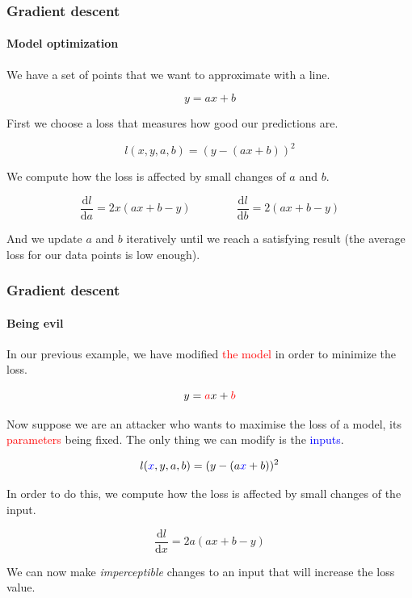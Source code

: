 \documentclass[9pt]{beamer}
\begin{document}
\begin{frame}
  \frametitle{Gradient descent}

  \framesubtitle{Model optimization}

  \begin{center}
    \scalebox{0.5}{
      
    }
  \end{center}

  We have a set of points that we want to approximate with a line.

  \[
  y = ax + b
  \]

  \pause

  First we choose a loss that measures how good our predictions are.

  \[
  l(x, y, a, b) = (y - (a x + b))^{2}
  \]

  \pause

  We compute how the loss is affected by small changes of $a$ and $b$.

  \[
  \frac{\mathrm{d}l}{\mathrm{d}a} = 2 x (ax + b - y) \qquad \qquad \frac{\mathrm{d}l}{\mathrm{d}b} = 2 (ax + b - y)
  \]

  And we update $a$ and $b$ iteratively until we reach a satisfying
  result (the average loss for our data points is low enough).

\end{frame}

\begin{frame}
  \frametitle{Gradient descent}

  \framesubtitle{Being evil}

  \vspace{-0.5cm}

  \begin{center}
    \scalebox{0.5}{
      
    }
  \end{center}

  In our previous example, we have modified \textcolor{red}{the model}
  in order to minimize the loss.

  \[
  y = \textcolor{red}{a}x + \textcolor{red}{b}
  \]

  \pause

  Now suppose we are an attacker who wants to maximise the loss of a
  model, its \textcolor{red}{parameters} being fixed. The only thing
  we can modify is the \textcolor{blue}{inputs}.

  \[
  l(\textcolor{blue}{x}, y, a, b) = (y - (a \textcolor{blue}{x} + b))^{2}
  \]

  \pause

  In order to do this, we compute how the loss is affected by small
  changes of the input.

  \[
  \frac{\mathrm{d}l}{\mathrm{d}x} = 2 a (ax + b - y)
  \]

  We can now make \emph{imperceptible} changes to an input that will
  increase the loss value.
\end{frame}
\end{document}
